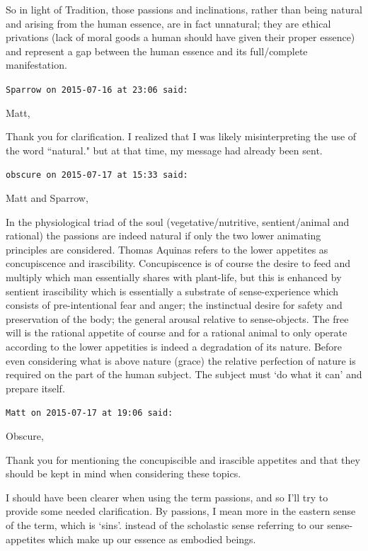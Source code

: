\begin{footnotesize}
\begin{sffamily}
So in light of Tradition, those passions and inclinations, rather than being natural and arising from the human essence, are in fact unnatural; they are ethical privations (lack of moral goods a human should have given their proper essence) and represent a gap between the human essence and its full/complete manifestation.


\hfill

\texttt{Sparrow on 2015-07-16 at 23:06 said: }

Matt,

Thank you for clarification. I realized that I was likely misinterpreting the use of the word ``natural." but at that time, my message had already been sent.


\hfill

\texttt{obscure on 2015-07-17 at 15:33 said: }

Matt and Sparrow,

In the physiological triad of the soul (vegetative/nutritive, sentient/animal and rational) the passions are indeed natural if only the two lower animating principles are considered. Thomas Aquinas refers to the lower appetites as concupiscence and irascibility. Concupiscence is of course the desire to feed and multiply which man essentially shares with plant-life, but this is enhanced by sentient irascibility which is essentially a substrate of sense-experience which consists of pre-intentional fear and anger; the instinctual desire for safety and preservation of the body; the general arousal relative to sense-objects. The free will is the rational appetite of course and for a rational animal to only operate according to the lower appetities is indeed a degradation of its nature. Before even considering what is above nature (grace) the relative perfection of nature is required on the part of the human subject. The subject must `do what it can' and prepare itself.


\hfill

\texttt{Matt on 2015-07-17 at 19:06 said: }

Obscure,

Thank you for mentioning the concupiscible and irascible appetites and that they should be kept in mind when considering these topics.

I should have been clearer when using the term passions, and so I'll try to provide some needed clarification. By passions, I mean more in the eastern sense of the term, which is `sins'. instead of the scholastic sense referring to our sense-appetites which make up our essence as embodied beings.



\end{sffamily}
\end{footnotesize}
